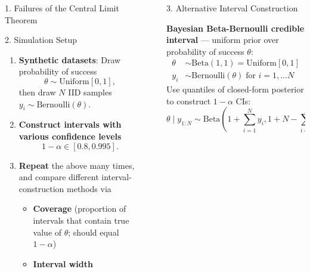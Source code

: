 \documentclass[final]{beamer}
\newlength{\sepwidth}
\newlength{\colwidth}
\newcommand{\separatorcolumn}{\begin{column}{\sepwidth}\end{column}}
\begin{document}
\begin{frame}[fragile]
\begin{columns}[t]
\begin{column}{\colwidth}
\begin{exampleblock}{1. Failures of the Central Limit Theorem}
  \end{exampleblock}

  \begin{exampleblock}{2. Simulation Setup}

    \begin{enumerate}
      \item \textbf{Synthetic datasets}: Draw probability of success 
      $$\theta \sim \text{Uniform}[0, 1],$$
      then draw $N$ IID samples 
      $y_i \sim \text{Bernoulli}(\theta).$%
      \item \textbf{Construct intervals with various confidence levels} 
      $$1-\alpha \in [0.8, 0.995].$$
      \item \textbf{Repeat} the above many times, and compare different interval-construction methods via
        \begin{itemize}
          \Large
          \item \textbf{Coverage} (proportion of intervals that contain true value of $\theta$; should equal $1-\alpha$)
          \item \textbf{Interval width}
        \end{itemize}
    \end{enumerate}




  \end{exampleblock}

\end{column}

\separatorcolumn

\begin{column}{\colwidth}

  \begin{block}{3. Alternative Interval Construction}

    \textbf{Bayesian Beta-Bernoulli credible interval} --- uniform prior over probability of success $\theta$:
    $$
    \begin{aligned}
      \theta &\sim \text{Beta}(1, 1) = \text{Uniform}[0, 1] \\
      y_i &\sim \text{Bernoulli}(\theta) \; \text{for } i=1,\dots N 
    \end{aligned}
    $$
    Use quantiles of closed-form posterior to construct $1-\alpha$ CIs:
    $$
    \theta \mid y_{1:N} \sim \text{Beta}\left(1 + \sum_{i=1}^N y_i, 1 + N - \sum_{i=1}^N y_i\right)
    $$


\end{block}
\end{column}
\end{columns}
\end{frame}
\end{document}
